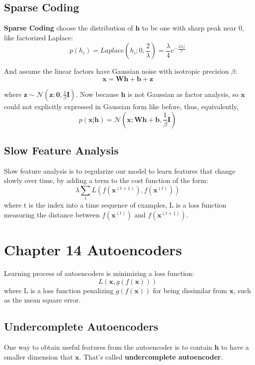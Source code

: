 \documentclass[12pt]{article}
\numberwithin{equation}{section}
\begin{document}
\subsection{Sparse Coding}
	\textbf{Sparse Coding} choose the distribution of $\bm{h}$ to be one with sharp peak near 0, like factorized Laplace:
	\begin{equation}
		p(h_i)=Laplace(h_i;0,\frac{2}{\lambda})=\frac{\lambda}{4}e^{-\frac{\lambda |h_i|}{2}}
	\end{equation} \par
	And assume the linear factors have Gaussian noise with isotropic precision $\beta$:
	\begin{equation}
		\bm{x} = \bm{Wh}+\bm{b}+ \bm{z}
	\end{equation} \par
	where $\bm{z} \sim \mathcal{N}(\bm{z;0,} \frac{1}{\beta}\bm{I})$. Now because $\bm{h}$ is not Gaussian as factor analysis, so $\bm{x}$ could not explicitly expressed in Gaussian form like before, thus, equivalently,
	\begin{equation}
		p(\bm{x}|\bm{h}) = \mathcal{N}(\bm{x;Wh+b,}\frac{1}{\beta} \bm{I})
	\end{equation} \par	 
\subsection{Slow Feature Analysis}
	Slow feature analysis is to regularize our model to learn features that change slowly over time, by adding a term to the cost function of the form:
	\begin{equation}
		\lambda \sum_t L(f(\bm{x}^{(t+1)}),f(\bm{x}^{(t)}))
	\end{equation}
	where t is the index into a time sequence of examples, L is a loss function measuring the distance between $f(\bm{x}^{(t)})$ and $f(\bm{x}^{(t+1)})$.
\section{Chapter 14 Autoencoders}
Learning process of autoencoders is minimizing a loss function:
\begin{equation}
	L(\bm{x},g(f(\bm{x})))
\end{equation}
where L is a loss function penalizing $g(f(\bm{x}))$ for being dissimilar from $\bm{x}$, such as the mean square error.
\subsection{Undercomplete Autoencoders}
	One way to obtain useful features from the autoencoder is to contain $\bm{h}$ to have a smaller dimension that $\bm{x}$. That's called \textbf{undercomplete autoencoder}.
\end{document}
